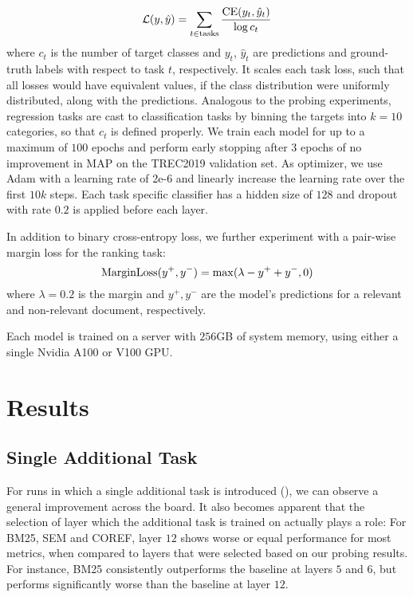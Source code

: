 \begin{equation}
    \mathcal{L}(y, \hat{y}) = \sum_{t \in \text{tasks}} \frac{\textnormal{CE}(y_t, \hat{y}_t)}{\log c_t}
\end{equation}
where $c_t$ is the number of target classes and $y_t$, $\hat{y}_t$ are predictions and ground-truth labels with respect to task $t$, respectively. It scales each task loss, such that all losses would have equivalent values, if the class distribution were uniformly distributed, along with the predictions. Analogous to the probing experiments, regression tasks are cast to classification tasks by binning the targets into $k=10$ categories, so that $c_t$ is defined properly.
We train each model for up to a maximum of $100$ epochs and perform early stopping after $3$ epochs of no improvement in MAP on the TREC2019 validation set. As optimizer, we use Adam \citep{kingma2014adam} with a learning rate of 2e-6 and linearly increase the learning rate over the first $10k$ steps. Each task specific classifier has a hidden size of $128$ and dropout with rate $0.2$ is applied before each layer.

In addition to binary cross-entropy loss, we further experiment with a pair-wise margin loss for the ranking task:
\begin{equation}
    \text{MarginLoss}(y^+, y^-) = \max(\lambda - y^+ + y^-, 0)
\end{equation}
where $\lambda=0.2$ is the margin and $y^+, y^-$ are the model's predictions for a relevant and non-relevant document, respectively.

Each model is trained on a server with $256$GB of system memory, using either a single Nvidia A100 or V100 GPU.


\section{Results}
\label{sec:mtl_results}
\subsection{Single Additional Task}
For runs in which a single additional task is introduced (), we can observe a general improvement across the board. It also becomes apparent that the selection of layer which the additional task is trained on actually plays a role: For BM25, SEM and COREF, layer $12$ shows worse or equal performance for most metrics, when compared to layers that were selected based on our probing results. For instance, BM25 consistently outperforms the baseline at layers $5$ and $6$, but performs significantly worse than the baseline at layer $12$.

